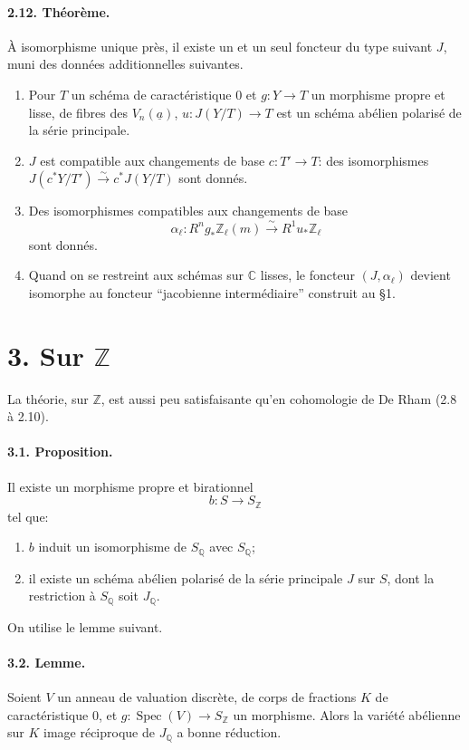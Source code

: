 \documentclass[10pt]{article}
\newcommand{\C}{\mathbb C}
\newcommand{\Q}{\mathbb Q}
\newcommand{\Z}{\mathbb Z}
\newcommand{\Spec}{\operatorname{Spec}}
\newcommand{\iso}{\xrightarrow{\sim}}
\begin{document}
\paragraph{2.12. Théorème.} À isomorphisme unique près, il existe un et un seul foncteur du type suivant \(J\), muni des données additionnelles suivantes.
\begin{enumerate}[label=\alph*)]
\item Pour \(T\) un schéma de caractéristique \(0\) et \(g:Y\to T\) un morphisme propre et lisse, de fibres des \(V_n(\underline a)\), \(u:J(Y/T)\to T\) est un schéma abélien polarisé de la série principale.
\item \(J\) est compatible aux changements de base \(c:T'\to T\): des isomorphismes \(J(c^*Y/T')\iso c^*J(Y/T)\) sont donnés.
\item Des isomorphismes compatibles aux changements de base
\[
\alpha_\ell:R^ng_*\Z_\ell(m)\iso R^1u_*\Z_\ell
\]
sont donnés.
\item Quand on se restreint aux schémas sur \(\C\) lisses, le foncteur \((J,\alpha_\ell)\) devient isomorphe au foncteur ``jacobienne intermédiaire'' construit au §1.
\end{enumerate}

\section*{3. Sur \(\Z\)}

La théorie, sur \(\Z\), est aussi peu satisfaisante qu'en cohomologie de De Rham (2.8 à 2.10).

\paragraph{3.1. Proposition.} Il existe un morphisme propre et birationnel
\[
b:S\longrightarrow S_\Z
\]
tel que:
\begin{enumerate}[label=\alph*)]
\item \(b\) induit un isomorphisme de \(S_\Q\) avec \(S_\Q\);
\item il existe un schéma abélien polarisé de la série principale \(J\) sur \(S\), dont la restriction à \(S_\Q\) soit \(J_\Q\).
\end{enumerate}

On utilise le lemme suivant.

\paragraph{3.2. Lemme.} Soient \(V\) un anneau de valuation discrète, de corps de fractions \(K\) de caractéristique \(0\), et \(g:\Spec(V)\to S_\Z\) un morphisme. Alors la variété abélienne sur \(K\) image réciproque de \(J_\Q\) a bonne réduction.
\end{document}
